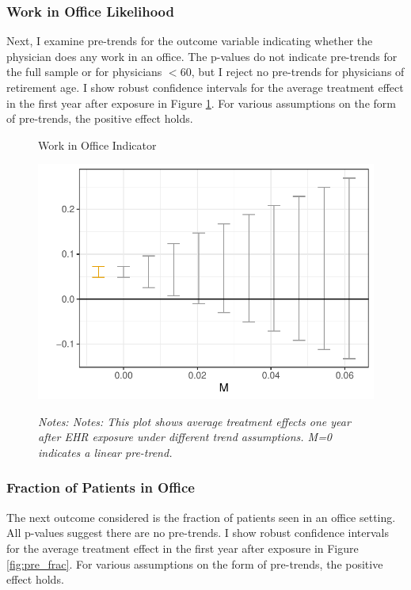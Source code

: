 \documentclass[12pt]{article}
\begin{document}
\subsubsection{Work in Office Likelihood}

Next, I examine pre-trends for the outcome variable indicating whether the physician does any work in an office. The p-values do not indicate pre-trends for the full sample or for physicians $< 60$, but I reject no pre-trends for physicians of retirement age. I show robust confidence intervals for the average treatment effect in the first year after exposure in Figure \ref{fig:pre_work}. For various assumptions on the form of pre-trends, the positive effect holds.

\begin{figure}[ht]
    \centering
    \captionsetup{width=.5\linewidth}
    \caption{Work in Office Indicator}
    \includegraphics[scale=.5]{Objects/office_ind_pretrends_plot.pdf}
    \label{fig:pre_work}
    \vspace{2mm}
    \caption*{\footnotesize{\textit{Notes: Notes: This plot shows average treatment effects one year after EHR exposure under different trend assumptions. M=0 indicates a linear pre-trend.}}}
\end{figure}

\subsubsection{Fraction of Patients in Office}

The next outcome considered is the fraction of patients seen in an office setting. All p-values suggest there are no pre-trends. I show robust confidence intervals for the average treatment effect in the first year after exposure in Figure \ref{fig:pre_frac}. For various assumptions on the form of pre-trends, the positive effect holds.
\end{document}
